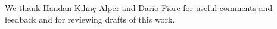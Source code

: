 We thank Handan K{\i}l{\i}n\c c Alper and Dario Fiore for useful comments and feedback and for reviewing drafts of this work. 


